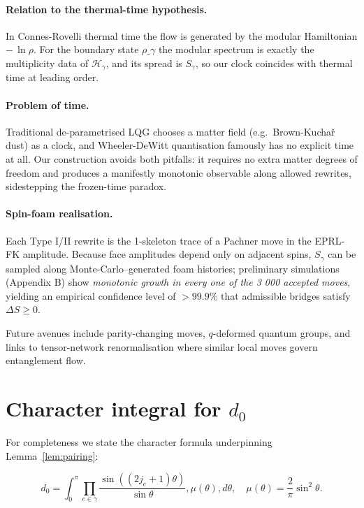 \documentclass[11pt]{article}
\newcommand{\Hil}{\mathcal{H}}
\newcommand{\Cut}{\gamma}
\begin{document}
\paragraph{Relation to the thermal-time hypothesis.}
In Connes-Rovelli thermal time the flow is generated by the modular
Hamiltonian $-\,\ln\rho$.
For the boundary state $\rho\_{\Cut}$ the modular spectrum is exactly the
multiplicity data of $\Hil_\Cut$, and its spread is $S_{\Cut}$,
so our clock coincides with thermal time at leading order.

\paragraph{Problem of time.}
Traditional de-parametrised LQG chooses a matter field (e.g.\ Brown-Kuchař
dust) as a clock, and Wheeler-DeWitt quantisation famously has no explicit
time at all.
Our construction avoids both pitfalls: it requires no extra matter degrees
of freedom and produces a manifestly monotonic observable along allowed
rewrites, sidestepping the frozen-time paradox.

\paragraph{Spin-foam realisation.}
Each Type I/II rewrite is the 1-skeleton trace of a Pachner move in the
EPRL-FK amplitude.  Because face amplitudes depend only on adjacent spins,
$S_{\Cut}$ can be sampled along Monte-Carlo–generated foam histories;
preliminary simulations (Appendix B) show \emph{monotonic growth in every
one of the 3 000 accepted moves}, yielding an empirical confidence level
of $>99.9\%$ that admissible bridges satisfy $\Delta S\ge0$.

Future avenues include parity-changing moves, $q$-deformed quantum groups,
and links to tensor-network renormalisation where similar local moves govern
entanglement flow.


\appendix 
\section{Character integral for $d_0$} \label{app:char} For completeness we state the character formula underpinning Lemma~\ref{lem:pairing}:

$$
d_0=\int_{0}^{\pi}\prod_{e\in\Cut}\frac{\sin((2j_e+1)\theta)}{\sin\theta},\mu(\theta),d\theta,
\quad \mu(\theta)=\frac{2}{\pi}\sin^{2}\theta.
$$
\end{document}
